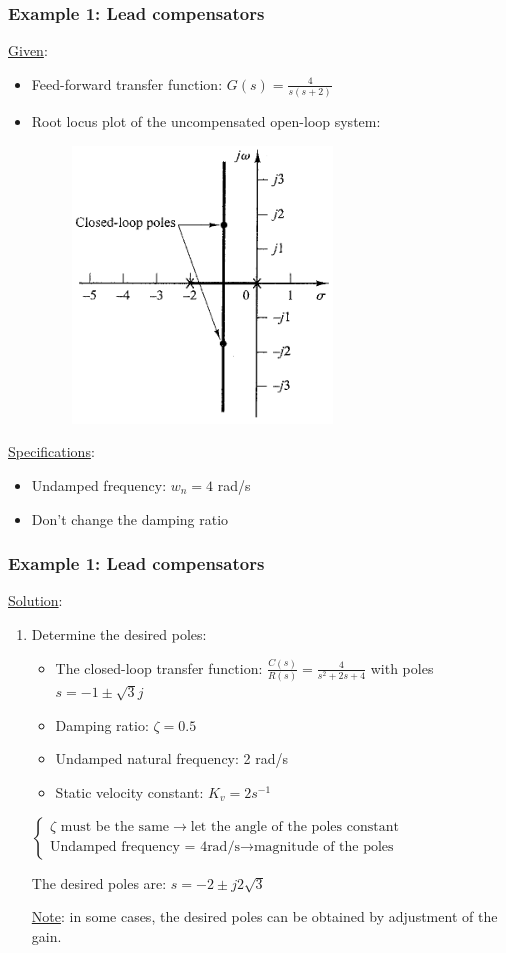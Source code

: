 \begin{frame}
	\frametitle{Example 1: Lead compensators}
	\underline{Given}:
	\begin{itemize}
		\item Feed-forward transfer function: $G(s)=\frac{4}{s(s+2)}$
		\item Root locus plot of the uncompensated open-loop system:
		\begin{figure}
			\centering
			\includegraphics[width=0.3\linewidth]{Ex1_rootlocus}
		\end{figure}
	\end{itemize}
	\underline{Specifications}:
	\begin{itemize}
		\item Undamped frequency: $w_n=4$ rad/s
		\item Don't change the damping ratio
	\end{itemize}
\end{frame}

\begin{frame}
	\frametitle{Example 1: Lead compensators}
	\underline{Solution}:
	\begin{enumerate}
		\item Determine the desired poles: 
		\begin{itemize}
			\item The closed-loop transfer function: $\frac{C(s)}{R(s)}=\frac{4}{s^2+2s+4}$ with poles $s=-1\pm\sqrt{3}j$
			\item Damping ratio: $\zeta=0.5$
			\item Undamped natural frequency: 2 rad/s
			\item Static velocity constant: $K_v=2s^{-1}$
		\end{itemize}
		\vspace{3mm}
		$\begin{cases}
			\zeta \text{ must be the same} \rightarrow \text{let the angle of the poles constant}\\
			\text{Undamped frequency = 4rad/s} \rightarrow \text{magnitude of the poles}
		\end{cases}$
		\vspace{1mm}
		
		The desired poles are: $s=-2\pm j2\sqrt{3}$
		\vspace{3mm}
		
		\underline{Note}: in some cases, the desired poles can be obtained by adjustment of the gain. 
	\end{enumerate}
\end{frame}

